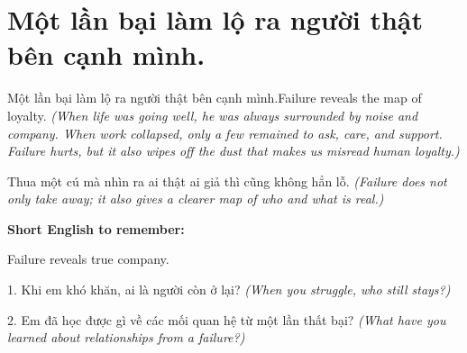 \section{Một lần bại làm lộ ra người thật bên cạnh mình.}
\begin{truyen}{Một lần bại làm lộ ra người thật bên cạnh mình.}{Failure reveals the map of loyalty.}
\textit{(When life was going well, he was always surrounded by noise and company. When work collapsed, only a few remained to ask, care, and support. Failure hurts, but it also wipes off the dust that makes us misread human loyalty.)}
\end{truyen}
\begin{baihoc}
Thua một cú mà nhìn ra ai thật ai giả thì cũng không hẳn lỗ.
\textit{(Failure does not only take away; it also gives a clearer map of who and what is real.)}
\end{baihoc}
\begin{ghinhoanh}
\textbf{Short English to remember:}

Failure reveals true company.
\end{ghinhoanh}
\begin{tuhocnhanh}
1. Khi em khó khăn, ai là người còn ở lại? \textit{(When you struggle, who still stays?)}

2. Em đã học được gì về các mối quan hệ từ một lần thất bại? \textit{(What have you learned about relationships from a failure?)}
\end{tuhocnhanh}
\ngancach

